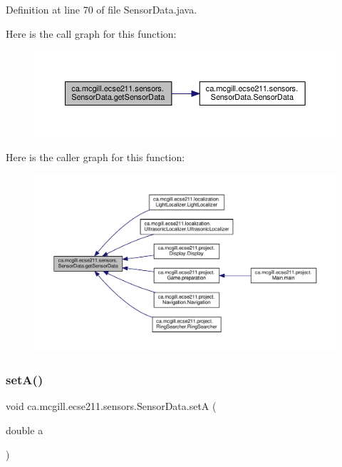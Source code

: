 Definition at line 70 of file Sensor\+Data.\+java.

Here is the call graph for this function\+:
\nopagebreak
\begin{figure}[H]
\begin{center}
\leavevmode
\includegraphics[width=350pt]{classca_1_1mcgill_1_1ecse211_1_1sensors_1_1_sensor_data_ab8aef4bdb5d9f3dad399656e00af2539_cgraph}
\end{center}
\end{figure}
Here is the caller graph for this function\+:
\nopagebreak
\begin{figure}[H]
\begin{center}
\leavevmode
\includegraphics[width=350pt]{classca_1_1mcgill_1_1ecse211_1_1sensors_1_1_sensor_data_ab8aef4bdb5d9f3dad399656e00af2539_icgraph}
\end{center}
\end{figure}
\mbox{\label{classca_1_1mcgill_1_1ecse211_1_1sensors_1_1_sensor_data_a9828d8b4dfb9b197e8fd149fb7deb63b}} 
\subsubsection{\texorpdfstring{set\+A()}{setA()}}
{\footnotesize\ttfamily void ca.\+mcgill.\+ecse211.\+sensors.\+Sensor\+Data.\+setA (\begin{DoxyParamCaption}\item[{double}]{a }\end{DoxyParamCaption})}

